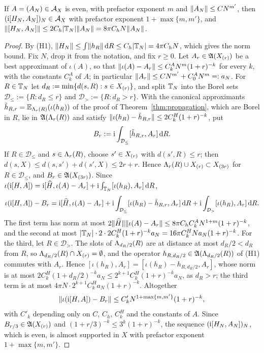 \begin{lemma}\label{lem:commutatorH}
If $A=(A_N)\in\mathcal{A}_X$ is even, with prefactor exponent $m$ and $\lVert A_N\rVert\le CN^{m'}$, then
$(\mathrm{i}[H_N,A_N])_N\in\mathcal{A}_X$ with prefactor exponent $1+\max\{m,m'\}$, and
$\lVert[H_N,A_N]\rVert\le2C_h\lvert\mathbb{T}_N\rvert\lVert A_N\rVert=8\pi C_hN\lVert A_N\rVert$.
\end{lemma}

\begin{proof}
By (H1), $\lVert H_N\rVert\le\int\lVert h_R\rVert\,\mathrm{d} R\le C_h\lvert\mathbb{T}_N\rvert=4\pi C_hN$, which gives the norm bound. Fix $N$, drop it
from the notation, and fix $r\ge0$. Let $A_r\in\mathfrak{A}(X_{(r)})$ be a best approximant of $\iota(A)$, so that
$\lVert\iota(A)-A_r\rVert\le C^A_kN^m(1+r)^{-k}$ for every $k$, with the constants $C^A_k$ of $A$; in particular
$\lVert A_r\rVert\le CN^{m'}+C^A_0N^m=:a_N$. For $R\in\mathbb{T}_N$ let $d_R:=\min\{d(s,R):s\in X_{(r)}\}$, and split $\mathbb{T}_N$ into
the Borel sets $\mathcal D_\le:=\{R:d_R\le r\}$ and $\mathcal D_>:=\{R:d_R>r\}$. With the canonical approximants
$\tilde h_{R,r}=\mathbb{E}_{\Lambda_{r}(R)}(\iota(h_R))$ of the proof of Theorem~\ref{thm:propagation}, which are Borel in $R$, lie in
$\mathfrak{A}(\Lambda_{r}(R))$ and satisfy $\lVert\iota(h_R)-\tilde h_{R,r}\rVert\le2C^H_k(1+r)^{-k}$, put
\[
B_r:=\mathrm{i}\int_{\mathcal D_\le}[\tilde h_{R,r},A_r]\,\mathrm{d} R .
\]
If $R\in\mathcal D_\le$ and $s\in\Lambda_{r}(R)$, choose $s'\in X_{(r)}$ with $d(s',R)\le r$; then
$d(s,X)\le d(s,s')+d(s',X)\le2r+r$. Hence $\Lambda_{r}(R)\cup X_{(r)}\subset X_{(3r)}$ for $R\in\mathcal D_\le$, and
$B_r\in\mathfrak{A}(X_{(3r)})$. Since $\iota(\mathrm{i}[H,A])=\mathrm{i}[\widehat{H},\iota(A)-A_r]+\mathrm{i}\int_{\mathbb{T}_N}[\iota(h_R),A_r]\,\mathrm{d} R$,
\[
\iota(\mathrm{i}[H,A])-B_r=\mathrm{i}[\widehat{H},\iota(A)-A_r]+\mathrm{i}\int_{\mathcal D_\le}[\iota(h_R)-\tilde h_{R,r},A_r]\,\mathrm{d} R
+\mathrm{i}\int_{\mathcal D_>}[\iota(h_R),A_r]\,\mathrm{d} R .
\]
The first term has norm at most $2\lVert\widehat{H}\rVert\lVert\iota(A)-A_r\rVert\le8\pi C_hC^A_kN^{1+m}(1+r)^{-k}$, and the second at
most $\lvert\mathbb{T}_N\rvert\cdot2\cdot2C^H_k(1+r)^{-k}a_N=16\pi C^H_kNa_N(1+r)^{-k}$. For the third, let $R\in\mathcal D_>$. The
slots of $\Lambda_{d_R/2}(R)$ are at distance at most $d_R/2<d_R$ from $R$, so $\Lambda_{d_R/2}(R)\cap X_{(r)}=\emptyset$, and the
operator $h_{R,d_R/2}\in\mathfrak{A}(\Lambda_{d_R/2}(R))$ of (H1) commutes with $A_r$. Hence
$[\iota(h_R),A_r]=[\iota(h_R)-h_{R,d_R/2},A_r]$, whose norm is at most
$2C^H_k(1+d_R/2)^{-k}a_N\le2^{k+1}C^H_k(1+r)^{-k}a_N$, as $d_R>r$; the third term is at most
$4\pi N\cdot2^{k+1}C^H_ka_N(1+r)^{-k}$. Altogether
\[
\lVert\iota(\mathrm{i}[H,A])-B_r\rVert\le C'_kN^{1+\max\{m,m'\}}(1+r)^{-k},
\]
with $C'_k$ depending only on $C$, $C_h$, $C^H_k$ and the constants of $A$. Since $B_{r/3}\in\mathfrak{A}(X_{(r)})$ and
$(1+r/3)^{-k}\le3^k(1+r)^{-k}$, the sequence $(\mathrm{i}[H_N,A_N])_N$, which is even, is almost supported in $X$ with prefactor
exponent $1+\max\{m,m'\}$.
\end{proof}

